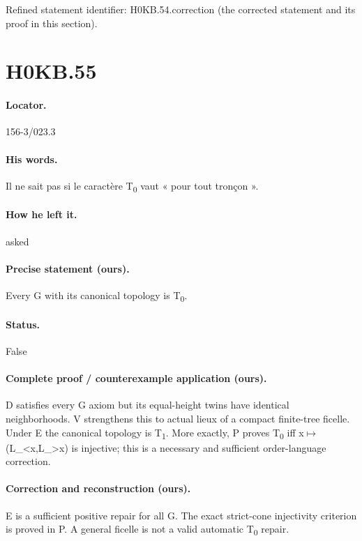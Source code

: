 \noindent Refined statement identifier: H0KB.54.correction (the corrected statement and its proof in this section).

\section*{H0KB.55}\label{statement:H0KB.55}
\paragraph{Locator.} 156-3/023.3

\paragraph{His words.} Il ne sait pas si le caractère T\textsubscript{0} vaut « pour tout tronçon ».

\paragraph{How he left it.} asked

\paragraph{Precise statement (ours).} Every G with its canonical topology is T\textsubscript{0}.

\paragraph{Status.} False

\paragraph{Complete proof / counterexample application (ours).} D satisfies every G axiom but its equal-height twins have identical neighborhoods. V strengthens this to actual lieux of a compact finite-tree ficelle. Under E the canonical topology is T\textsubscript{1}. More exactly, P proves T\textsubscript{0} iff x\ensuremath{\mapsto}(L\_<x,L\_>x) is injective; this is a necessary and sufficient order-language correction.

\paragraph{Correction and reconstruction (ours).} E is a sufficient positive repair for all G. The exact strict-cone injectivity criterion is proved in P. A general ficelle is not a valid automatic T\textsubscript{0} repair.

